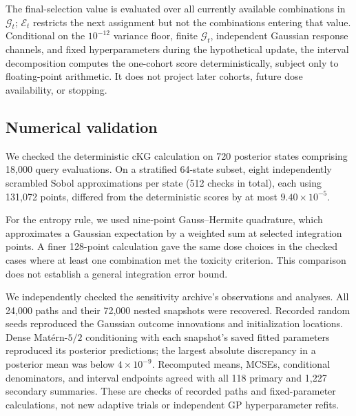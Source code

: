 \documentclass[11pt]{article}
\newcommand{\rev}[1]{{#1}}
\begin{document}
The final-selection value is evaluated over all currently available combinations in $\mathcal G_t$; $\mathcal E_t$ restricts the next assignment but not the combinations entering that value. Conditional on the $10^{-12}$ variance floor, finite $\mathcal G_t$, independent Gaussian response channels, and fixed hyperparameters during the hypothetical update, the interval decomposition computes the one-cohort score deterministically, subject only to floating-point arithmetic. It does not project later cohorts, future dose availability, or stopping.

\subsection{Numerical validation}\label{sec:numerical_impl}

We checked the deterministic cKG calculation on 720 posterior states comprising 18,000 query evaluations. On a stratified 64-state subset, eight independently scrambled Sobol approximations per state (512 checks in total), each using 131,072 points, differed from the deterministic scores by at most $9.40\times10^{-5}$.

For the entropy rule, we used nine-point Gauss--Hermite quadrature, which approximates a Gaussian expectation by a weighted sum at selected integration points. A finer 128-point calculation gave the same dose choices in the checked cases where at least one combination met the toxicity criterion. This comparison does not establish a general integration error bound.

\rev{We independently checked the sensitivity archive's observations and analyses.} All 24,000 paths and their 72,000 nested snapshots were recovered. Recorded random seeds reproduced the Gaussian outcome innovations and initialization locations. Dense Mat\'ern-$5/2$ conditioning with each snapshot's saved fitted parameters reproduced its posterior predictions; the largest absolute discrepancy in a posterior mean was below $4\times10^{-9}$. Recomputed means, MCSEs, conditional denominators, and interval endpoints agreed with all 118 primary and 1,227 secondary summaries. These are checks of recorded paths and fixed-parameter calculations, not new adaptive trials or independent GP hyperparameter refits.
\end{document}

